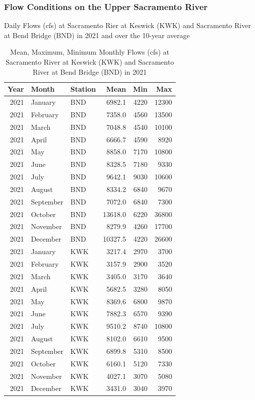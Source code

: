 \documentclass[
]{book}
\theoremstyle{definition}
\theoremstyle{definition}
\theoremstyle{definition}
\theoremstyle{definition}
\theoremstyle{remark}
\begin{document}
\hypertarget{flow-conditions-on-the-upper-sacramento-river}{%
\subsubsection{Flow Conditions on the Upper Sacramento River}\label{flow-conditions-on-the-upper-sacramento-river}}

\label{fig:KWKBNDflow-fig}Daily Flows (cfs) at Sacramento Rier at Keswick (KWK) and Sacramento River at Bend Bridge (BND) in 2021 and over the 10-year average

\begin{table}
\centering
\caption{Mean, Maximum, Minimum Monthly Flows (cfs) at Sacramento River at Keswick (KWK) and Sacramento River at Bend Bridge (BND)  in 2021}
\centering
\begin{tabular}[t]{rllrrr}
\hline
Year & Month & Station & Mean & Min & Max\\
\hline
2021 & January & BND & 6982.1 & 4220 & 12300\\
\hline
2021 & February & BND & 7358.0 & 4560 & 13500\\
\hline
2021 & March & BND & 7048.8 & 4540 & 10100\\
\hline
2021 & April & BND & 6666.7 & 4590 & 8920\\
\hline
2021 & May & BND & 8858.0 & 7170 & 10800\\
\hline
2021 & June & BND & 8328.5 & 7180 & 9330\\
\hline
2021 & July & BND & 9642.1 & 9030 & 10600\\
\hline
2021 & August & BND & 8334.2 & 6840 & 9670\\
\hline
2021 & September & BND & 7072.0 & 6840 & 7300\\
\hline
2021 & October & BND & 13618.0 & 6220 & 36800\\
\hline
2021 & November & BND & 8279.9 & 4260 & 17700\\
\hline
2021 & December & BND & 10327.5 & 4220 & 26600\\
\hline
2021 & January & KWK & 3217.4 & 2970 & 3700\\
\hline
2021 & February & KWK & 3157.9 & 2900 & 3520\\
\hline
2021 & March & KWK & 3405.0 & 3170 & 3640\\
\hline
2021 & April & KWK & 5682.5 & 3280 & 8050\\
\hline
2021 & May & KWK & 8369.6 & 6800 & 9870\\
\hline
2021 & June & KWK & 7882.3 & 6570 & 9390\\
\hline
2021 & July & KWK & 9510.2 & 8740 & 10800\\
\hline
2021 & August & KWK & 8102.0 & 6610 & 9500\\
\hline
2021 & September & KWK & 6899.8 & 5310 & 8500\\
\hline
2021 & October & KWK & 6160.1 & 5120 & 7330\\
\hline
2021 & November & KWK & 4027.1 & 3070 & 5080\\
\hline
2021 & December & KWK & 3431.0 & 3040 & 3970\\
\hline
\end{tabular}
\end{table}
\end{document}
